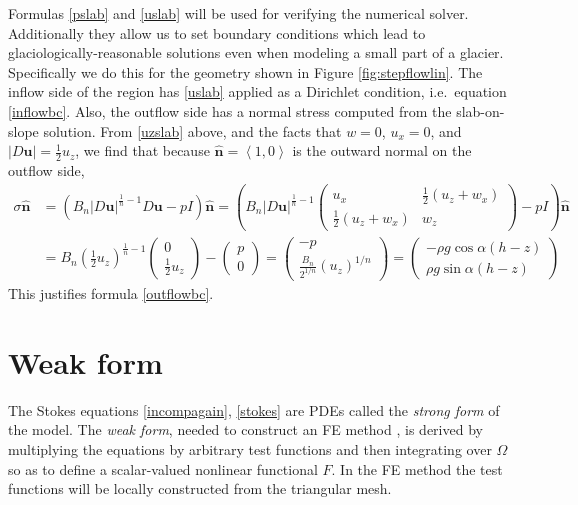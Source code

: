 \documentclass[letterpaper,final,12pt,reqno]{amsart}
\newcommand{\hbn}{\hat{\mathbf{n}}}
\newcommand{\bu}{\mathbf{u}}
\begin{document}
Formulas \eqref{pslab} and \eqref{uslab} will be used for verifying the numerical solver.  Additionally they allow us to set boundary conditions which lead to glaciologically-reasonable solutions even when modeling a small part of a glacier.  Specifically we do this for the geometry shown in Figure \ref{fig:stepflowlin}.  The inflow side of the region has \eqref{uslab} applied as a Dirichlet condition, i.e.~equation \eqref{inflowbc}.  Also, the outflow side has a normal stress computed from the slab-on-slope solution.  From \eqref{uzslab} above, and the facts that $w=0$, $u_x=0$, and $|D\bu| = \frac{1}{2} u_z$, we find that because $\hbn=\left<1,0\right>$ is the outward normal on the outflow side,
\begin{align*}
\sigma \hbn &= \left(B_n |D\bu|^{\frac{1}{n}-1} D\bu - pI\right)\hbn = \left(B_n |D\bu|^{\frac{1}{n}-1} \begin{pmatrix} u_x & \frac{1}{2}(u_z+w_x) \\ \frac{1}{2}(u_z+w_x) & w_z \end{pmatrix} - pI\right)\hbn \\
    &= B_n \left(\frac{1}{2} u_z\right)^{\frac{1}{n}-1} \begin{pmatrix} 0 \\ \frac{1}{2} u_z \end{pmatrix} - \begin{pmatrix} p \\ 0 \end{pmatrix} = \begin{pmatrix} - p \\ \frac{B_n}{2^{1/n}} (u_z)^{1/n} \end{pmatrix} = \begin{pmatrix} - \rho g\cos\alpha (h-z) \\ \rho g\sin\alpha (h-z) \end{pmatrix}
\end{align*}
This justifies formula \eqref{outflowbc}.


\section{Weak form}

The Stokes equations \eqref{incompagain}, \eqref{stokes} are PDEs called the \emph{strong form} of the model.  The \emph{weak form}, needed to construct an FE method \cite{Elmanetal2014}, is derived by multiplying the equations by arbitrary test functions and then integrating over $\Omega$ so as to define a scalar-valued nonlinear functional $F$.  In the FE method the test functions will be locally constructed from the triangular mesh.
\end{document}
